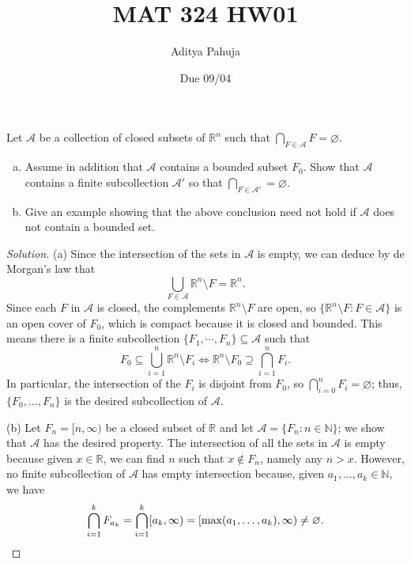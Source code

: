 \documentclass[11pt]{article}
\title{\vspace{-2em}MAT 324 HW01}
\author{\large Aditya Pahuja}
\date{\large Due 09/04}
\providecommand{\NN}{\mathbb N}
\providecommand{\RR}{\mathbb R}
\providecommand{\ii}{\item}
\newenvironment{soln}{\begin{proof}[Solution]}{\end{proof}}
\begin{document}
\maketitle

\begin{problem}
    Let $\mathcal A$ be a collection of closed subsets of $\RR^n$
    such that $\bigcap_{F\in\mathcal A} F=\varnothing$.
    \begin{enumerate}[(a)]
        \ii Assume in addition that $\mathcal A$ contains a bounded subset $F_0$.
	Show that $\mathcal A$ contains a finite subcollection $\mathcal A'$
	so that $\bigcap_{F\in\mathcal A'} = \varnothing$.
	\ii Give an example showing that the above conclusion need not hold
	if $\mathcal A$ does not contain a bounded set.
    \end{enumerate}
\end{problem}

\begin{soln}
    (a) Since the intersection of the sets in $\mathcal A$ is empty,
    we can deduce by de Morgan's law that
    \begin{equation*}
	\bigcup_{F\in\mathcal A}\RR^n\setminus F = \RR^n.
    \end{equation*}
    Since each $F$ in $\mathcal A$ is closed,
    the complements $\RR^n\setminus F$ are open,
    so $\{\RR^n\setminus F : F\in\mathcal A\}$ is an open cover of $F_0$,
    which is compact because it is closed and bounded.
    This means there is a finite subcollection $\{F_1,\cdots,F_n\}\subseteq\mathcal A$
    such that
    \begin{equation*}
	F_0\subseteq \bigcup_{i=1}^n \RR^n\setminus F_i
	\iff
	\RR^n\setminus F_0\supseteq \bigcap_{i=1}^n F_i.
    \end{equation*}
    In particular, the intersection of the $F_i$ is disjoint from $F_0$, so
    $\bigcap_{i=0}^n F_i = \varnothing$;
    thus, $\{F_0,\dots, F_n\}$ is the desired subcollection of $\mathcal A$.

    (b) Let $F_n = [n,\infty)$ be a closed subset of $\RR$
    and let $\mathcal A = \{F_n : n\in\NN\}$; we show that $\mathcal A$
    has the desired property.
    The intersection of all the sets in $\mathcal A$ is empty
    because given $x\in\RR$, we can find $n$ such that $x\notin F_n$,
    namely any $n > x$. However, no finite subcollection of $\mathcal A$
    has empty intersection because, given $a_1,\dots,a_k\in\NN$, we have
    \begin{equation*}
	\bigcap_{i=1}^k F_{a_k} =
	\bigcap_{i=1}^k [a_k, \infty) =
	[\max(a_1, \dots, a_k), \infty)\ne\varnothing.\qedhere
    \end{equation*}
\end{soln}
\end{document}
